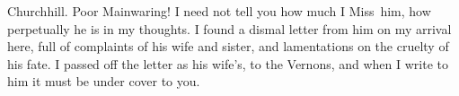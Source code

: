 \begin{mail}{Churchhill.}{}
Poor Mainwaring! I need not tell you how much I Miss~him, how perpetually he is in my thoughts. I found a dismal letter from him on my arrival here, full of complaints of his wife and sister, and lamentations on the cruelty of his fate. I passed off the letter as his wife's, to the Vernons, and when I write to him it must be under cover to you. 

\end{mail}